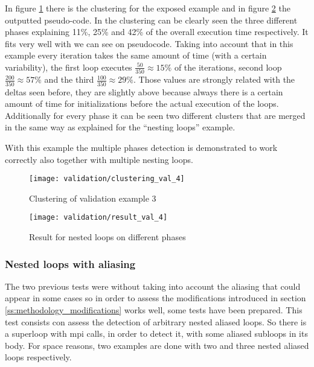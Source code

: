 In figure \ref{fig:clustering_val_4} there is the clustering for the exposed
example and in figure \ref{fig:result_val_4} the outputted pseudo-code. In the
clustering can be clearly seen the three different phases explaining 11\%, 25\%
and 42\% of the overall execution time respectively. It fits very well with we can
see on pseudocode. Taking into account that in this example every iteration
takes the same amount of time (with a certain variability), the first loop
executes $\frac{50}{350} \approx 15\%$ of the iterations, second loop 
$\frac{200}{350} \approx 57\%$ and the third $\frac{100}{350} \approx 29\%$.
Those values are strongly related with the deltas seen before, they are slightly
above because always there is a certain amount of time for initializations
before the actual execution of the loops. Additionally for every phase it can be
seen two different clusters that are merged in the same way as explained for the
``nesting loops'' example.

With this example the multiple phases detection is demonstrated to work
correctly also together with multiple nesting loops.

\begin{figure}[H]
  \centering
  \texttt{[image: validation/clustering\_val\_4]}
  \caption{Clustering of validation example 3}
  \label{fig:clustering_val_4}
\end{figure}

\begin{figure}[H]
    \centering
    \texttt{[image: validation/result\_val\_4]}
    \caption{Result for nested loops on different phases}
    \label{fig:result_val_4}
\end{figure}

\subsubsection{Nested loops with aliasing}

The two previous tests were without taking into account the aliasing that could
appear in some cases so in order to assess the modifications introduced in
section \ref{ss:methodology_modifications} works well, some tests have been
prepared. This test consists con assess the detection of arbitrary nested
aliased loops. So there is a superloop with mpi calls, in order to detect it,
with some aliased subloops in its body. For space reasons, two examples are
done with two and three nested aliased loops respectively.

